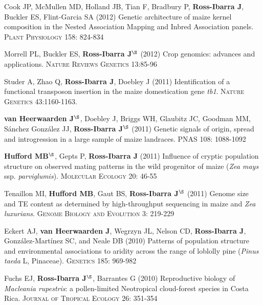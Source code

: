 \begin{etaremune}
\item Cook JP, McMullen MD, Holland JB, Tian F, Bradbury P, {\bf Ross-Ibarra J}, Buckler ES, Flint-Garcia SA (2012) Genetic architecture of maize kernel composition in the Nested Association Mapping and Inbred Association panels. \textsc{Plant Physiology} 158: 824-834

\item Morrell PL, Buckler ES, {\bf Ross-Ibarra J}$^\S$ (2012) Crop genomics: advances and applications.  \textsc{Nature Reviews Genetics} 13:85-96 %


\item Studer A, Zhao Q, {\bf Ross-Ibarra J}, Doebley J (2011) Identification of a functional transposon insertion in the maize domestication gene \emph{tb1}.  \textsc{Nature Genetics} 43:1160-1163.


\item {\bf van Heerwaarden J}$^\S$, Doebley J, Briggs WH, Glaubitz JC, Goodman MM, S\'{a}nchez Gonz\'{a}lez JJ, {\bf Ross-Ibarra J}$^\S$ (2011) Genetic signals of origin, spread and introgression in a large sample of maize landraces. PNAS 108: 1088-1092


\item {\bf Hufford MB}$^\S$, Gepts P, {\bf Ross-Ibarra J} (2011) Influence of cryptic population structure on observed mating patterns in the wild progenitor of maize (\emph{Zea mays} ssp. \emph{parviglumis}).  \textsc{Molecular Ecology} 20: 46-55


\item Tenaillon MI, {\bf Hufford MB}, Gaut BS, {\bf Ross-Ibarra J}$^\S$ (2011)  Genome size and TE content as determined by high-throughput sequencing in maize and \emph{Zea luxurians}.  \textsc{Genome Biology and Evolution } 3: 219-229


\item Eckert AJ, {\bf van Heerwaarden J}, Wegrzyn JL, Nelson CD, {\bf Ross-Ibarra J}, Gonz\'{a}lez-Mart\'{i}nez SC, and Neale DB (2010) Patterns of population structure and environmental associations to aridity across the range of loblolly pine (\emph{Pinus taeda} L, Pinaceae).  \textsc{Genetics} 185: 969-982


\item Fuchs EJ, {\bf Ross-Ibarra J}$^\S$, Barrantes G (2010) Reproductive biology of \emph{Macleania rupestris}: a pollen-limited Neotropical cloud-forest species in Costa Rica.  \textsc{Journal of Tropical Ecology} 26: 351-354



\end{etaremune}
